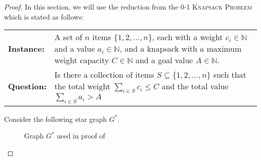 \begin{proof}


In this section, we will use the reduction from the \textsc{0-1 Knapsack Problem} which is stated as follows:
\begin{center}
\begin{tabular}{|>{\centering\arraybackslash}m{2cm}|m{10cm}|}
\hline
\multicolumn{2}{|c|}{\textsc{0-1 Knapsack Problem}} \\ \hline
\textbf{Instance:} & A set of $ n $ items $ \{1, 2, \dots, n\} $, each with a weight $ c_i \in \mathbb{N}$ and a value $ a_i \in \mathbb{N} $, and a knapsack with a maximum weight capacity $ C \in \mathbb{N} $ and a goal value $A \in \mathbb{N}$. \\ \hline
\textbf{Question:} & Is there a collection of items $ S \subseteq \{1, 2, \dots, n\} $ such that the total weight $ \sum_{i \in S} c_i \leq C $ and the total value $ \sum_{i \in S} a_i > A$ \\ \hline
\end{tabular}
\end{center}
Consider the following star graph $G^*$.
\begin{figure}[H]
    \centering
    \caption{Graph $G^*$ used in proof of~}
    \label{fig:star}
\end{figure}


\end{proof}
